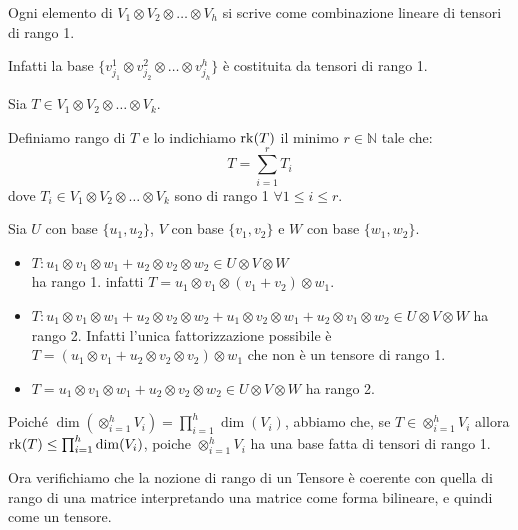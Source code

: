 \documentclass[../main.tex]{subfiles}
\begin{document}
Ogni elemento di $V_1 \otimes V_2 \otimes \ldots \otimes V_h$ si scrive come combinazione lineare di tensori di rango 1.

Infatti la base $\{v_{j_1}^1 \otimes v_{j_2}^2 \otimes \ldots \otimes v_{j_h}^h\}$ è costituita da tensori di rango 1.
\begin{definition}
    \label{rango-di-un-tensore}
    Sia $T \in V_1 \otimes V_2 \otimes \ldots \otimes V_k$.

    Definiamo rango di $T$ e lo indichiamo $\operatorname{rk}(T)$ il minimo $r \in \mathbb{N}$ tale che:
    \begin{equation*}
        T = \sum_{i=1}^{r}T_i
    \end{equation*}
    dove $T_i \in V_1 \otimes V_2 \otimes \ldots \otimes V_k$ sono di rango 1 $\forall 1 \leq i \leq r$.
\end{definition}

\begin{example}
    Sia $U$ con base $\{u_1, u_2\}$, $V$ con base $\{v_1, v_2\}$ e $W$ con base $\{w_1, w_2\}$.
    \begin{itemize}
        \item $T: u_1 \otimes v_1 \otimes w_1 + u_2 \otimes v_2 \otimes w_2  \in U \otimes V  \otimes W$\\
              ha rango 1. infatti $T = u_1 \otimes v_1 \otimes (v_1 + v_2 )\otimes w_1$.
        \item $T: u_1 \otimes v_1 \otimes w_1 + u_2 \otimes v_2 \otimes w_2 + u_1 \otimes v_2 \otimes w_1 + u_2 \otimes v_1 \otimes w_2 \in U \otimes V \otimes W$ ha rango 2.
              Infatti l'unica fattorizzazione possibile è $T = (u_1 \otimes v_1  + u_2 \otimes v_2 \otimes v_2) \otimes w_1$ che non è un tensore di rango 1.
        \item $T = u_1 \otimes v_1 \otimes w_1 + u_2 \otimes v_2 \otimes w_2 \in U \otimes V \otimes W $ ha rango 2.
    \end{itemize}
\end{example}

Poiché $\dim(\otimes_{i=1}^{h} V_i) = \prod_{i=1}^{h} \dim(V_i)$, abbiamo che, se $T \in \otimes_{i=1}^{h} V_i$ allora $\operatorname{rk}(T) \leq \prod_{i=1}^{h} \dim(V_i)$, poiche $\otimes_{i=1}^{h} V_i$ ha una base fatta di tensori di rango 1.

Ora verifichiamo che la nozione di rango di un Tensore è coerente con quella di rango di una matrice interpretando una matrice come forma bilineare, e quindi come un tensore.
\end{document}
